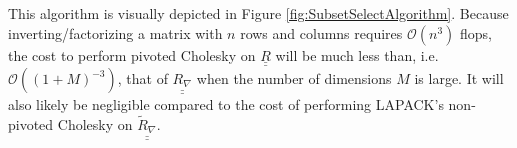 This algorithm is visually depicted in Figure 
\ref{fig:SubsetSelectAlgorithm}.  Because inverting/factorizing a matrix 
with $n$ rows and columns requires $\mathcal{O}\left(n^3\right)$ flops, 
the cost to perform pivoted Cholesky on $\underline{\underline{R}}$ will be 
much less than, i.e. $\mathcal{O}\left((1+M)^{-3}\right)$, that of 
$\underline{\underline{R_{\nabla}}}$ when the number of dimensions $M$ 
is large.  It will also likely be negligible compared to the cost of
performing LAPACK's non-pivoted Cholesky on 
$\underline{\underline{\tilde{R}_{\nabla}}}$.
